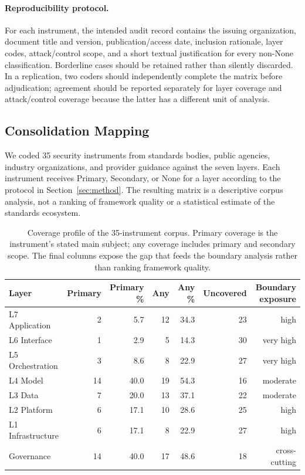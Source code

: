 \documentclass[runningheads]{llncs}
\begin{document}
\paragraph{Reproducibility protocol.} For each instrument, the intended audit record contains the issuing organization, document title and version, publication/access date, inclusion rationale, layer codes, attack/control scope, and a short textual justification for every non-None classification. Borderline cases should be retained rather than silently discarded. In a replication, two coders should independently complete the matrix before adjudication; agreement should be reported separately for layer coverage and attack/control coverage because the latter has a different unit of analysis.

\subsection{Consolidation Mapping}
\label{sec:matrix}

We coded 35 security instruments from standards bodies, public agencies, industry organizations, and provider guidance against the seven layers. Each instrument receives Primary, Secondary, or None for a layer according to the protocol in Section~\ref{sec:method}. The resulting matrix is a descriptive corpus analysis, not a ranking of framework quality or a statistical estimate of the standards ecosystem.

\begin{table}[t]
\caption{Coverage profile of the 35-instrument corpus. Primary coverage is the instrument's stated main subject; any coverage includes primary and secondary scope. The final columns expose the gap that feeds the boundary analysis rather than ranking framework quality.}
\label{tab:coverage}
\centering
\small
\setlength{\tabcolsep}{3pt}
\begin{tabular}{@{}lrrrrrr@{}}
\toprule
\textbf{Layer} & \textbf{Primary} & \textbf{Primary \%} & \textbf{Any} & \textbf{Any \%} & \textbf{Uncovered} & \textbf{Boundary exposure}\\
\midrule
L7 Application & 2 & 5.7 & 12 & 34.3 & 23 & high\\
L6 Interface & 1 & 2.9 & 5 & 14.3 & 30 & very high\\
L5 Orchestration & 3 & 8.6 & 8 & 22.9 & 27 & very high\\
L4 Model & 14 & 40.0 & 19 & 54.3 & 16 & moderate\\
L3 Data & 7 & 20.0 & 13 & 37.1 & 22 & moderate\\
L2 Platform & 6 & 17.1 & 10 & 28.6 & 25 & high\\
L1 Infrastructure & 6 & 17.1 & 8 & 22.9 & 27 & high\\
Governance & 14 & 40.0 & 17 & 48.6 & 18 & cross-cutting\\
\bottomrule
\end{tabular}
\end{table}
\end{document}

